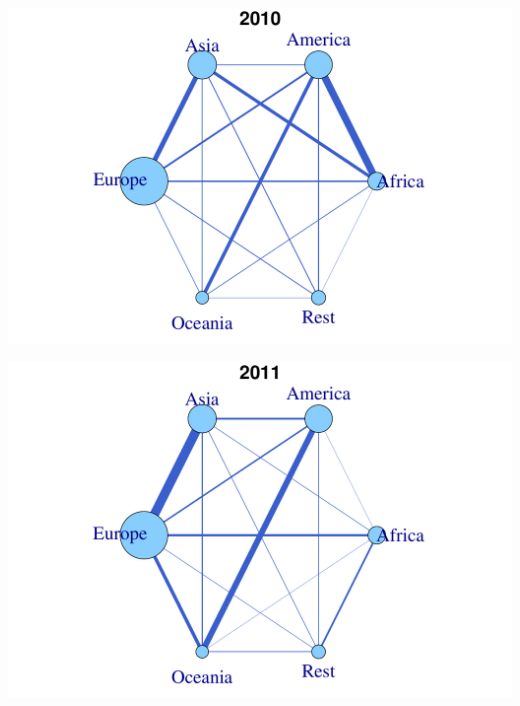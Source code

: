 \documentclass[a4paper,ngerman,oneside,titlepage,bibliography=totoc,11pt]{scrreprt}
\begin{document}
\begin{minipage}[t]{0.48\textwidth}
		\centering
			\includegraphics[width=1\textwidth]{Grafiken/Cont_Ani/cont19.pdf}
\end{minipage}	
\hfill	
\begin{minipage}[t]{0.48\textwidth}	
			\centering
			\includegraphics[width=1\textwidth]{Grafiken/Cont_Ani/cont20.pdf}
\end{minipage}
\end{document}
